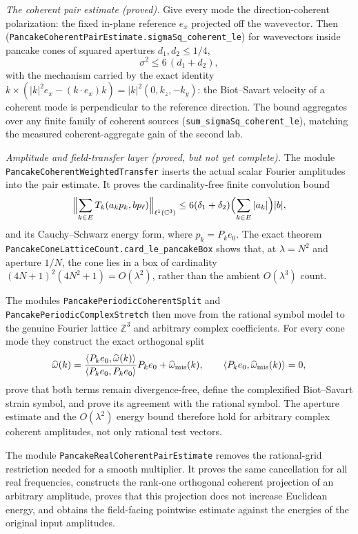 \documentclass[11pt]{article}
\theoremstyle{definition}
\begin{document}
\emph{The coherent pair estimate (proved).}  Give every mode the
direction-coherent polarization: the fixed in-plane reference $e_x$
projected off the wavevector.  Then
(\texttt{PancakeCoherentPairEstimate.sigmaSq\_coherent\_le}) for
wavevectors inside pancake cones of squared apertures
$d_1, d_2 \le 1/4$,
\[
  \sigma^2 \le 6\,(d_1 + d_2),
\]
with the mechanism carried by the exact identity
$k \times (|k|^2 e_x - (k\cdot e_x)k) = |k|^2 (0, k_z, -k_y)$: the
Biot--Savart velocity of a coherent mode is perpendicular to the
reference direction.  The bound aggregates over any finite family of
coherent sources (\texttt{sum\_sigmaSq\_coherent\_le}), matching the
measured coherent-aggregate gain of the second lab.

\emph{Amplitude and field-transfer layer (proved, but not yet complete).}
The module \texttt{PancakeCoherentWeightedTransfer} inserts the actual scalar
Fourier amplitudes into the pair estimate.  It proves the cardinality-free
finite convolution bound
\[
  \Bigl\|\sum_{k\in E} T_k(a_kp_k,bp_\ell)\Bigr\|_{\ell^1(\mathbb C^3)}
  \le 6(\delta_1+\delta_2)\Bigl(\sum_{k\in E}|a_k|\Bigr)|b|,
\]
and its Cauchy--Schwarz energy form, where $p_k=P_ke_0$.  The exact theorem
\texttt{PancakeConeLatticeCount.card\_le\_pancakeBox} shows that, at
$\lambda=N^2$ and aperture $1/N$, the cone lies in a box of cardinality
$(4N+1)^2(4N^2+1)=O(\lambda^2)$, rather than the ambient
$O(\lambda^3)$ count.

The modules \texttt{PancakePeriodicCoherentSplit} and
\texttt{PancakePeriodicComplexStretch} then move from the rational symbol
model to the genuine Fourier lattice $\mathbb Z^3$ and arbitrary complex
coefficients.  For every cone mode they construct the exact orthogonal split
\[
 \widehat\omega(k)=
 \frac{\langle P_ke_0,\widehat\omega(k)\rangle}
      {\langle P_ke_0,P_ke_0\rangle}P_ke_0
 +\widehat\omega_{\rm mis}(k),
 \qquad
 \langle P_ke_0,\widehat\omega_{\rm mis}(k)\rangle=0,
\]
prove that both terms remain divergence-free, define the complexified
Biot--Savart strain symbol, and prove its agreement with the rational symbol.
The aperture estimate and the $O(\lambda^2)$ energy bound therefore hold for
arbitrary complex coherent amplitudes, not only rational test vectors.

The module \texttt{PancakeRealCoherentPairEstimate} removes the rational-grid
restriction needed for a smooth multiplier.  It proves the same cancellation
for all real frequencies, constructs the rank-one orthogonal coherent
projection of an arbitrary amplitude, proves that this projection does not
increase Euclidean energy, and obtains the field-facing pointwise estimate
against the energies of the original input amplitudes.
\end{document}
